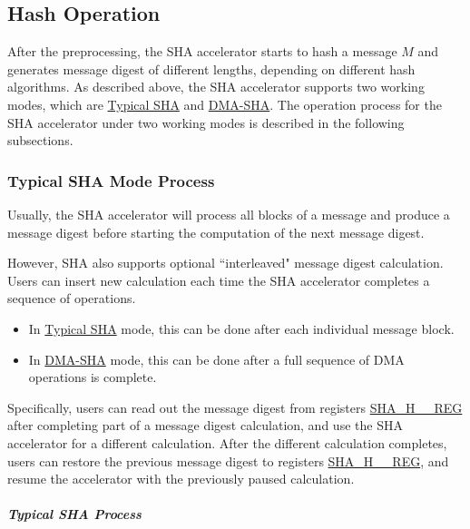 \documentclass[main\_\_EN.tex]{subfiles}
\begin{document}
\subsection{Hash Operation}\label{sec:sha-hash-operation}

After the preprocessing, the \chipname{} SHA accelerator starts to hash a message \begin{math}M\end{math} and generates message digest of different lengths, depending on different hash algorithms. As described above, the \chipname{} SHA accelerator supports two working modes, which are \hyperref[sec:sha-typical-sha]{Typical SHA} and \hyperref[sec:sha-dma-sha]{DMA-SHA}. The
operation process for the SHA accelerator under two working modes is described in the following subsections.

\subsubsection{Typical SHA Mode Process}\label{sec:sha-typical-sha}

Usually, the SHA accelerator will process all blocks of a message and produce a message digest before starting the computation of the next message digest.

However, \chipname{} SHA also supports optional ``interleaved" message digest calculation. Users can insert new calculation each time the SHA accelerator completes a sequence of operations.
\begin{itemize}
    \item In \hyperref[sec:sha-typical-sha]{Typical SHA} mode, this can be done after each individual message block. 
    \item In \hyperref[sec:sha-dma-sha]{DMA-SHA} mode, this can be done after a full sequence of DMA operations is complete.
\end{itemize} 

Specifically, users can read out the message digest from  registers \hyperref[regdesc:SHAHNREG]{SHA\_H\_\_REG} after completing part of a message digest calculation, and use the SHA accelerator for a different calculation. After the different calculation completes, users can restore the previous message digest to registers \hyperref[regdesc:SHAHNREG]{SHA\_H\_\_REG}, and resume the accelerator with the previously paused calculation.

\subparagraph{Typical SHA Process}
\end{document}
